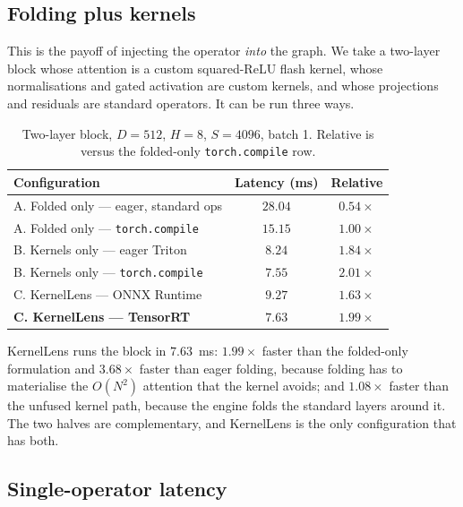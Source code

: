 \documentclass{article}
\begin{document}
\subsection{Folding plus kernels}

This is the payoff of injecting the operator \emph{into} the graph. We take a
two-layer block whose attention is a custom squared-ReLU flash kernel, whose
normalisations and gated activation are custom kernels, and whose projections and
residuals are standard operators. It can be run three ways.

\begin{table}[t]
\centering
\small
\begin{tabular}{lc c}
\toprule
\textbf{Configuration} & \textbf{Latency (ms)} & \textbf{Relative} \\ \midrule
A. Folded only --- eager, standard ops & $28.04$ & $0.54\times$ \\
A. Folded only --- \texttt{torch.compile} & $15.15$ & $1.00\times$ \\ \midrule
B. Kernels only --- eager Triton & $8.24$ & $1.84\times$ \\
B. Kernels only --- \texttt{torch.compile} & $7.55$ & $2.01\times$ \\ \midrule
C. KernelLens --- ONNX Runtime & $9.27$ & $1.63\times$ \\
\textbf{C. KernelLens --- TensorRT} & $\mathbf{7.63}$ & $\mathbf{1.99\times}$ \\
\bottomrule
\end{tabular}
\caption{Two-layer block, $D{=}512$, $H{=}8$, $S{=}4096$, batch 1. Relative is
versus the folded-only \texttt{torch.compile} row.}
\label{tab:folding}
\end{table}

KernelLens runs the block in $7.63$~ms: $1.99\times$ faster than the folded-only
formulation and $3.68\times$ faster than eager folding, because folding has to
materialise the $O(N^2)$ attention that the kernel avoids; and $1.08\times$ faster
than the unfused kernel path, because the engine folds the standard layers around
it. The two halves are complementary, and KernelLens is the only configuration
that has both.

\subsection{Single-operator latency}
\end{document}
